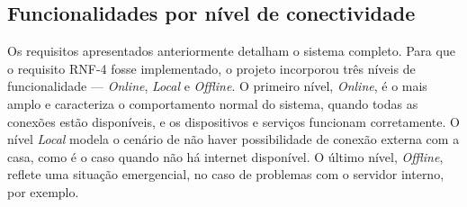 \subsection{Funcionalidades por nível de conectividade}

Os requisitos apresentados anteriormente detalham o sistema completo. Para que o requisito RNF-4 fosse implementado, o projeto incorporou três níveis de funcionalidade --- \emph{Online}, \emph{Local} e \emph{Offline}. O primeiro nível, \emph{Online}, é o mais amplo e caracteriza o comportamento normal do sistema, quando todas as conexões estão disponíveis, e os dispositivos e serviços funcionam corretamente. O nível \emph{Local} modela o cenário de não haver possibilidade de conexão externa com a casa, como é o caso quando não há internet disponível. O último nível, \emph{Offline}, reflete uma situação emergencial, no caso de problemas com o servidor interno, por exemplo.
